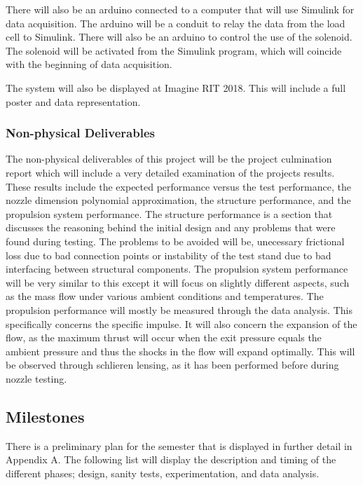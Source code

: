 \documentclass[conference]{IEEEtran} %
\begin{document}
There will also be an arduino connected to a computer that will use Simulink for data acquisition. The arduino will be a conduit to relay the data from the load cell
to Simulink. There will also be an arduino to control the use of the solenoid. The solenoid will be activated from the Simulink program, which will coincide with
the beginning of data acquisition.

The system will also be displayed at Imagine RIT 2018. This will include a full poster and data representation.

\subsubsection{Non-physical Deliverables}
\label{subsubsec: non-physical deliverables}

The non-physical deliverables of this project will be the project culmination report which will include a very detailed examination of the projects
results. These results include the expected performance versus the test performance, the nozzle dimension polynomial approximation, the structure performance, and the
propulsion system performance. The structure performance is a section that discusses the reasoning behind the initial design and any problems
that were found during testing. The problems to be avoided will be, unecessary frictional loss due to bad connection points or instability of the test stand due to
bad interfacing between structural components. The propulsion system performance will be very similar to this except it will focus on slightly different aspects, such as
the mass flow under various ambient conditions and temperatures. The propulsion performance will mostly be measured through the data analysis. This specifically concerns the
specific impulse. It will also concern the expansion of the flow, as the maximum thrust will occur when the exit pressure equals the ambient pressure and thus the shocks
in the flow will expand optimally. This will be observed through schlieren lensing, as it has been performed before during nozzle testing.

\subsection{Milestones}
\label{subsec:milestones}

There is a preliminary plan for the semester that is displayed in further detail in Appendix A. The following list will display the description and timing
of the different phases; design, sanity tests, experimentation, and data analysis.
\end{document}
